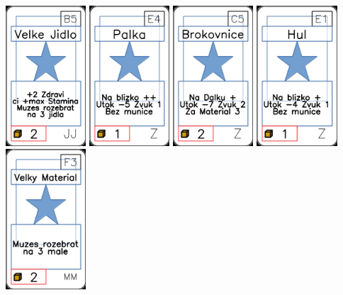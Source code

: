 \documentclass[a4paper]{article}
\begin{document}
	\includegraphics[width=3.0cm]{img-1_39}
	\includegraphics[width=3.0cm]{img-1_83}
	\includegraphics[width=3.0cm]{img-1_104}
	\includegraphics[width=3.0cm]{img-1_80}
	\includegraphics[width=3.0cm]{img-1_57}
\end{document}
